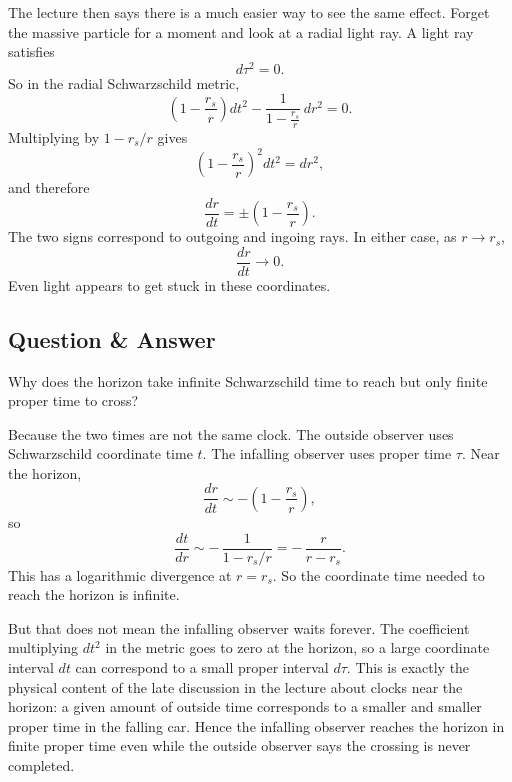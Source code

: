 The lecture then says there is a much easier way to see the same effect. Forget the massive particle for a moment and look at a radial light ray. A light ray satisfies
\begin{equation}
d\tau^2=0.
\end{equation}
So in the radial Schwarzschild metric,
\begin{equation}
\left(1-\frac{r_s}{r}\right)dt^2
-
\frac{1}{1-\frac{r_s}{r}}\,dr^2
=0.
\end{equation}
Multiplying by \(1-r_s/r\) gives
\begin{equation}
\left(1-\frac{r_s}{r}\right)^2dt^2 = dr^2,
\end{equation}
and therefore
\begin{equation}
\frac{dr}{dt}=\pm\left(1-\frac{r_s}{r}\right).
\end{equation}
The two signs correspond to outgoing and ingoing rays. In either case, as \(r\to r_s\),
\begin{equation}
\frac{dr}{dt}\to 0.
\end{equation}
Even light appears to get stuck in these coordinates.

\subsection{Question \& Answer}

Why does the horizon take infinite Schwarzschild time to reach but only finite proper time to cross?

Because the two times are not the same clock. The outside observer uses Schwarzschild coordinate time \(t\). The infalling observer uses proper time \(\tau\). Near the horizon,
\begin{equation}
\frac{dr}{dt}\sim -\left(1-\frac{r_s}{r}\right),
\end{equation}
so
\begin{equation}
\frac{dt}{dr}\sim -\,\frac{1}{1-r_s/r}
=
-\,\frac{r}{r-r_s}.
\end{equation}
This has a logarithmic divergence at \(r=r_s\). So the coordinate time needed to reach the horizon is infinite.

But that does not mean the infalling observer waits forever. The coefficient multiplying \(dt^2\) in the metric goes to zero at the horizon, so a large coordinate interval \(dt\) can correspond to a small proper interval \(d\tau\). This is exactly the physical content of the late discussion in the lecture about clocks near the horizon: a given amount of outside time corresponds to a smaller and smaller proper time in the falling car. Hence the infalling observer reaches the horizon in finite proper time even while the outside observer says the crossing is never completed.

